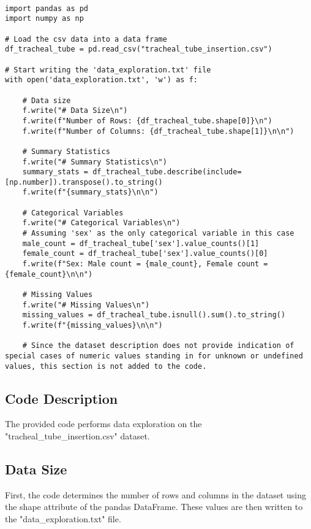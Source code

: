 \documentclass[11pt]{article}
\begin{document}
\begin{verbatim}

import pandas as pd
import numpy as np

# Load the csv data into a data frame
df_tracheal_tube = pd.read_csv("tracheal_tube_insertion.csv")

# Start writing the 'data_exploration.txt' file
with open('data_exploration.txt', 'w') as f:

    # Data size
    f.write("# Data Size\n")
    f.write(f"Number of Rows: {df_tracheal_tube.shape[0]}\n")
    f.write(f"Number of Columns: {df_tracheal_tube.shape[1]}\n\n")

    # Summary Statistics
    f.write("# Summary Statistics\n")
    summary_stats = df_tracheal_tube.describe(include=[np.number]).transpose().to_string()
    f.write(f"{summary_stats}\n\n")

    # Categorical Variables
    f.write("# Categorical Variables\n")
    # Assuming 'sex' as the only categorical variable in this case
    male_count = df_tracheal_tube['sex'].value_counts()[1]
    female_count = df_tracheal_tube['sex'].value_counts()[0]
    f.write(f"Sex: Male count = {male_count}, Female count = {female_count}\n\n")

    # Missing Values
    f.write("# Missing Values\n")
    missing_values = df_tracheal_tube.isnull().sum().to_string()
    f.write(f"{missing_values}\n\n")

    # Since the dataset description does not provide indication of special cases of numeric values standing in for unknown or undefined values, this section is not added to the code.

\end{verbatim}

\subsection{Code Description}

The provided code performs data exploration on the "tracheal\_tube\_insertion.csv" dataset. 

\subsection{Data Size}
First, the code determines the number of rows and columns in the dataset using the shape attribute of the pandas DataFrame. These values are then written to the "data\_exploration.txt" file.
\end{document}
